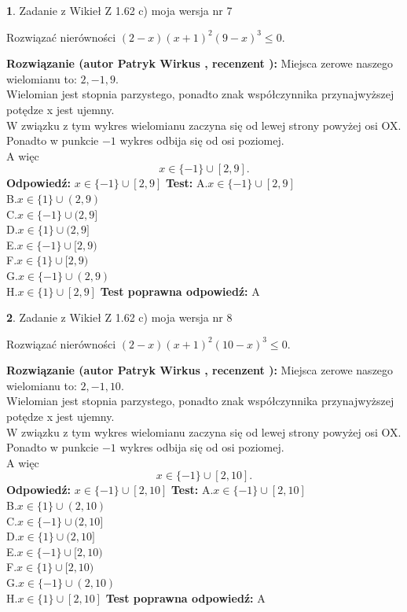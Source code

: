 \documentclass[12pt, a4paper]{article}
\theoremstyle{definition} %
\newtheorem{zad}{}
\newcommand{\zadStart}[1]{\begin{zad}#1\newline}
\newcommand{\zadStop}{\end{zad}}
\newcommand{\rozwStart}[2]{\noindent \textbf{Rozwiązanie (autor #1 , recenzent #2): }\newline}
\newcommand{\rozwStop}{\newline}
\newcommand{\odpStart}{\noindent \textbf{Odpowiedź:}\newline}
\newcommand{\odpStop}{\newline}
\newcommand{\testStart}{\noindent \textbf{Test:}\newline}
\newcommand{\testStop}{\newline}
\newcommand{\kluczStart}{\noindent \textbf{Test poprawna odpowiedź:}\newline}
\newcommand{\kluczStop}{\newline}
\begin{document}
\zadStart{Zadanie z Wikieł Z 1.62 c) moja wersja nr 7}

Rozwiązać nierówności $(2-x)(x+1)^{2}(9-x)^{3}\le0$.
\zadStop
\rozwStart{Patryk Wirkus}{}
Miejsca zerowe naszego wielomianu to: $2, -1, 9$.\\
Wielomian jest stopnia parzystego, ponadto znak współczynnika przy\linebreak najwyższej potędze x jest ujemny.\\ W związku z tym wykres wielomianu zaczyna się od lewej strony powyżej osi OX.\\
Ponadto w punkcie $-1$ wykres odbija się od osi poziomej.\\
A więc $$x \in \{-1\} \cup [2,9].$$
\rozwStop
\odpStart
$x \in \{-1\} \cup [2,9]$
\odpStop
\testStart
A.$x \in \{-1\} \cup [2,9]$\\
B.$x \in \{1\} \cup (2,9)$\\
C.$x \in \{-1\} \cup (2,9]$\\
D.$x \in \{1\} \cup (2,9]$\\
E.$x \in \{-1\} \cup [2,9)$\\
F.$x \in \{1\} \cup [2,9)$\\
G.$x \in \{-1\} \cup (2,9)$\\
H.$x \in \{1\} \cup [2,9]$
\testStop
\kluczStart
A
\kluczStop



\zadStart{Zadanie z Wikieł Z 1.62 c) moja wersja nr 8}

Rozwiązać nierówności $(2-x)(x+1)^{2}(10-x)^{3}\le0$.
\zadStop
\rozwStart{Patryk Wirkus}{}
Miejsca zerowe naszego wielomianu to: $2, -1, 10$.\\
Wielomian jest stopnia parzystego, ponadto znak współczynnika przy\linebreak najwyższej potędze x jest ujemny.\\ W związku z tym wykres wielomianu zaczyna się od lewej strony powyżej osi OX.\\
Ponadto w punkcie $-1$ wykres odbija się od osi poziomej.\\
A więc $$x \in \{-1\} \cup [2,10].$$
\rozwStop
\odpStart
$x \in \{-1\} \cup [2,10]$
\odpStop
\testStart
A.$x \in \{-1\} \cup [2,10]$\\
B.$x \in \{1\} \cup (2,10)$\\
C.$x \in \{-1\} \cup (2,10]$\\
D.$x \in \{1\} \cup (2,10]$\\
E.$x \in \{-1\} \cup [2,10)$\\
F.$x \in \{1\} \cup [2,10)$\\
G.$x \in \{-1\} \cup (2,10)$\\
H.$x \in \{1\} \cup [2,10]$
\testStop
\kluczStart
A
\kluczStop
\end{document}
